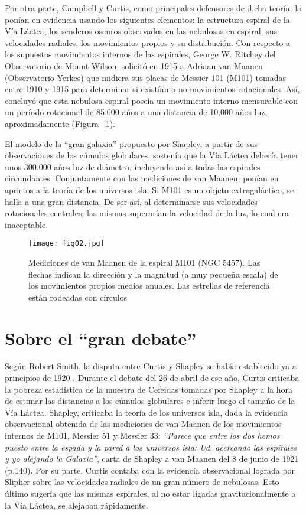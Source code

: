 \documentclass[baaa]{baaa}
\begin{document}
Por otra parte, Campbell y Curtis, como principales defensores de dicha teoría, la ponían en evidencia usando los siguientes elementos: la estructura espiral de la Vía Láctea, los senderos oscuros observados en las nebulosas en espiral, sus velocidades radiales, los movimientos propios y su distribución. Con respecto a los supuestos movimientos internos de las espirales, George W. Ritchey del Observatorio de Mount Wilson, solicitó en 1915 a Adriaan van Maanen (Observatorio Yerkes) que midiera sus placas de Messier 101 (M101) tomadas entre 1910 y 1915 para determinar si existían o no movimientos rotacionales. Así, concluyó que esta nebulosa espiral poseía un movimiento interno mensurable con un período rotacional de 85.000 años a una distancia de 10.000 años luz, aproximadamente (Figura ~\ref{Figura2}).

El modelo de la “gran galaxia” propuesto por Shapley, a partir de sus observaciones de los cúmulos globulares, sostenía que la Vía Láctea debería tener unos 300.000 años luz de diámetro, incluyendo así a todas las espirales circundantes. Conjuntamente con las mediciones de van Maanen, ponían en aprietos a la teoría de los universos isla. Si M101 es un objeto extragaláctico, se halla a una gran distancia. De ser así, al determinarse sus velocidades rotacionales centrales, las mismas superarían la velocidad de la luz, lo cual era inaceptable.

\begin{figure}[!t]
\centering
\texttt{[image: fig02.jpg]}
\caption{Mediciones de van Maanen de la espiral M101 (NGC 5457). Las flechas indican la dirección y la magnitud (a muy pequeña escala) de los movimientos propios medios anuales. Las estrellas de referencia están rodeadas con círculos \citep{Maanen1916}}
\label{Figura2}
\end{figure}


\section{Sobre el “gran debate”}

Según Robert Smith, la disputa entre Curtis y Shapley se había establecido ya a principios de 1920 \citep{Smith1993}. Durante el debate del 26 de abril de ese año, Curtis criticaba la pobreza estadística de la muestra de Cefeidas tomadas por Shapley a la hora de estimar las distancias a los cúmulos globulares e inferir luego el tamaño de la Vía Láctea. Shapley, criticaba la teoría de los universos isla, dada la evidencia observacional obtenida de las mediciones de van Maanen de los movimientos internos de M101, Messier 51 y Messier 33: \textit{“Parece que entre los dos hemos puesto entre la espada y la pared a los universos isla: Ud. acercando las espirales y yo alejando la Galaxia”}, carta de Shapley a van Maanen del 8 de junio de 1921 \citep{Smith1993} (p.140). Por su parte, Curtis contaba con la evidencia observacional lograda por Slipher sobre las velocidades radiales de un gran número de nebulosas. Esto último sugería que las mismas espirales, al no estar ligadas gravitacionalmente a la Vía Láctea, se alejaban rápidamente.
\end{document}
